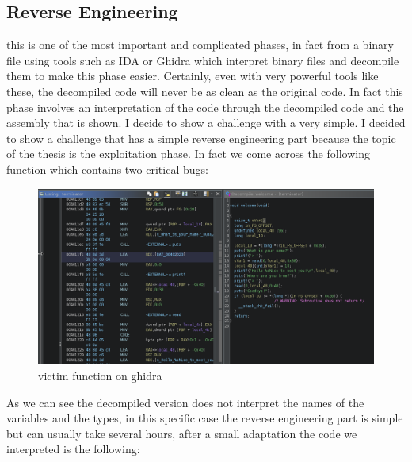 \documentclass{report}
\begin{document}
    \subsection{Reverse Engineering}
    this is one of the most important and complicated phases, in fact from a binary file using tools such as IDA or Ghidra which interpret binary files and decompile them to make this phase easier.\newline
    Certainly, even with very powerful tools like these, the decompiled code will never be as clean as the original code.\newline
    In fact this phase involves an interpretation of the code through the decompiled code and the assembly that is shown.
    I decide to show a challenge with a very simple.
    I decided to show a challenge that has a simple reverse engineering part because the topic of the thesis is the exploitation phase.
    In fact we come across the following function which contains two critical bugs:\newline
    \clearpage
    \begin{figure}[h]
        \includegraphics[width=1.3\linewidth]{terminator_rev.png}
        \caption{victim function on ghidra}
        \label{fig:rev_terminator}
    \end{figure}
    As we can see the decompiled version does not interpret the names of the variables and the types, in this specific case the reverse engineering part is simple but can usually take several hours, after a small adaptation the code we interpreted is the following:\newline
\end{document}
